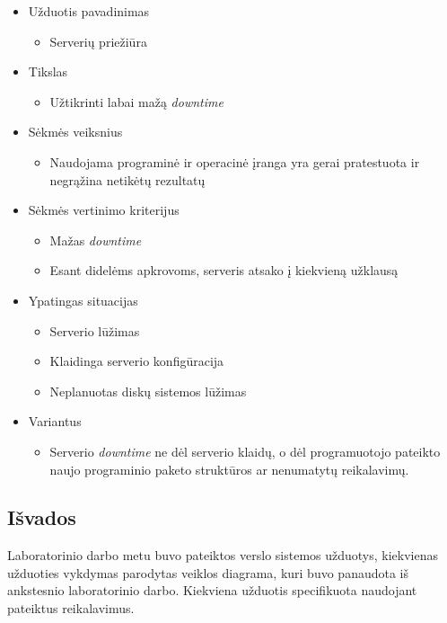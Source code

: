 \documentclass[10pt]{IEEEtran}
\begin{document}
            \begin{itemize}
                \item Užduotis pavadinimas
                \begin{itemize}
                    \item Serverių priežiūra
                \end{itemize}
                \item Tikslas
                \begin{itemize}
                    \item Užtikrinti labai mažą \textit{downtime}
                \end{itemize}
                \item Sėkmės veiksnius
                \begin{itemize}
                    \item Naudojama programinė ir operacinė įranga yra gerai pratestuota ir negrąžina netikėtų rezultatų
                \end{itemize}
                \item Sėkmės vertinimo kriterijus
                \begin{itemize}
                    \item Mažas \textit{downtime}
                    \item Esant didelėms apkrovoms, serveris atsako į kiekvieną užklausą
                \end{itemize}
                \item Ypatingas situacijas
                \begin{itemize}
                    \item Serverio lūžimas
                    \item Klaidinga serverio konfigūracija
                    \item Neplanuotas diskų sistemos lūžimas
                \end{itemize}
                \item Variantus
                \begin{itemize}
                    \item Serverio \textit{downtime} ne dėl serverio klaidų, o dėl programuotojo pateikto naujo programinio paketo struktūros ar nenumatytų reikalavimų.
                \end{itemize}
            \end{itemize}

        \subsection{Išvados}

            Laboratorinio darbo metu buvo pateiktos verslo sistemos užduotys, kiekvienas užduoties vykdymas parodytas veiklos diagrama, kuri buvo panaudota iš ankstesnio laboratorinio darbo. Kiekviena užduotis specifikuota naudojant pateiktus reikalavimus.
\end{document}
